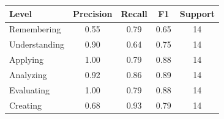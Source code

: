 \begin{tabular}{lcccc}
\hline
Level & Precision & Recall & F1 & Support \\
\hline
Remembering & 0.55 & 0.79 & 0.65 & 14 \\
Understanding & 0.90 & 0.64 & 0.75 & 14 \\
Applying & 1.00 & 0.79 & 0.88 & 14 \\
Analyzing & 0.92 & 0.86 & 0.89 & 14 \\
Evaluating & 1.00 & 0.79 & 0.88 & 14 \\
Creating & 0.68 & 0.93 & 0.79 & 14 \\
\hline
\end{tabular}